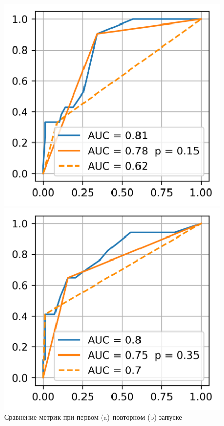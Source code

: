 \begin{figure}[!htb]
	\centering
	\begin{minipage}{0.32\textwidth}
		\includegraphics[width=\linewidth]{pictures/Обе метрики при 0 запуске}
	\end{minipage}
	\hspace{0.1\textwidth}
	\begin{minipage}{0.32\textwidth}
		\includegraphics[width=\linewidth]{pictures/Обе метрики при 1 запуске}
		
	\end{minipage}
	\caption{Сравнение метрик  при первом (a) повторном (b) запуске}
\end{figure}
